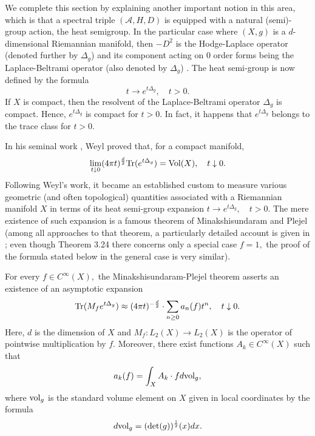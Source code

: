 \documentclass[12pt]{article}
\begin{document}
We complete this section by explaining another important notion in this area, which is that a spectral triple $(\mathcal{A},H,D)$ is equipped with a natural (semi)-group action, the heat semigroup. In the particular case where $(X,g)$ is a $d$-dimensional Riemannian manifold, then $-D^2$ is the Hodge-Laplace operator (denoted further by $\Delta_g$) and its component acting on $0$ order forms being the Laplace-Beltrami operator (also denoted by $\Delta_g$) \cite{Rosenberg}. The heat semi-group is now defined by the formula
$$t\to e^{t\Delta_g},\quad t>0.$$
If $X$ is compact, then the resolvent of the Laplace-Beltrami operator $\Delta_g$ is compact. Hence, $e^{t\Delta_g}$ is compact for $t>0.$ In fact, it happens that $e^{t\Delta_g}$ belongs to the trace class for $t>0.$

In his seminal work \cite{Weyl}, Weyl proved that, for a compact manifold,
\begin{equation}\label{weyl formula}
\lim_{t\downarrow0}(4\pi t)^{\frac{d}{2}}{\rm Tr}(e^{t\Delta_g})={\rm Vol}(X),\quad t\downarrow0.
\end{equation}
Following Weyl's work, it became an established custom to measure various geometric (and often topological) quantities associated with a Riemannian manifold $X$ in terms of its heat semi-group expansion $t\to e^{t\Delta_g},\quad t>0.$ The mere existence of such expansion is a famous theorem of Minakshisundaram and Plejel (among all approaches to that theorem, a particularly detailed account is given in \cite{Rosenberg}; even though Theorem 3.24 there concerns only a special case $f=1,$ the proof of the formula stated below in the general case is very similar). 

For every $f\in C^{\infty}(X),$ the Minakshisundaram-Plejel theorem asserts an existence of an asymptotic expansion 
\begin{equation}\label{heat asymptotic}
{\rm Tr}(M_fe^{t\Delta_g})\approx (4\pi t)^{-\frac{d}{2}}\cdot \sum_{n\geq0}a_n(f)t^n,\quad t\downarrow0.
\end{equation}
Here, $d$ is the dimension of $X$ and $M_f:L_2(X)\to L_2(X)$ is the operator of pointwise multiplication by $f.$ Moreover, there exist functions $A_k\in C^{\infty}(X)$ such that
\begin{equation}\label{normality of coefficients}
a_k(f)=\int_X A_k\cdot f d{\rm vol}_g,
\end{equation}
where ${\rm vol}_g$ is the standard volume element on $X$ given in local coordinates by the formula
$$d{\rm vol}_g=({\rm det}(g))^{\frac12}(x)dx.$$
\end{document}
